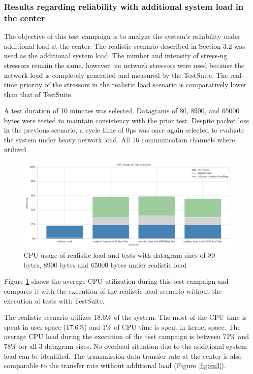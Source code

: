 \documentclass[	a4paper,
				11pt,
				DIV=11,
				bigheadings,
				idxtotoc,
				listof=totoc,	
				bibtotoc,		
				halfparskip,
				cleardoubleempty,
				oneside,
				openright]{scrartcl}
\begin{document}
\subsubsection{Results regarding reliability with additional system load in the center}

The objective of this test campaign is to analyze the system's reliability under additional load at the center. The realistic scenario described in Section 3.2 was used as the additional system load. The number and intensity of stress-ng stressors remain the same, however, no network stressors were used because the network load is completely generated and measured by the TestSuite. The real-time priority of the stressors in the realistic load scenario is comparatively lower than that of TestSuite.

A test duration of 10 minutes was selected. Datagrams of 80, 8900, and 65000 bytes were tested to maintain consistency with the prior test. Despite packet loss in the previous scenario, a cycle time of 0µs was once again selected to evaluate the system under heavy network load. All 16 communication channels where utilized.

\begin{figure}[h]
	\includegraphics[width=\textwidth]{fig6.png}
	\centering
	\caption{CPU usage of realistic load and tests with datagram sizes of 80 bytes, 8900 bytes and 65000 bytes under realistic load}
    \label{fig:fig6}
\end{figure}

Figure \ref{fig:fig6} shows the average CPU utilization during this test campaign and compares it with the execution of the realistic load scenario without the execution of tests with TestSuite.

The realistic scenario utilizes 18.6\% of the system. The most of the CPU time is spent in user space (17.6\%) and 1\% of CPU time is spent in kernel space. The average CPU load during the execution of the test campaign is between 72\% and 78\% for all 3 datagram sizes. No overload situation due to the additional system load can be identified. The transmission data transfer rate at the center is also comparable to the transfer rate without additional load (Figure \ref{fig:su3}).
\end{document}

